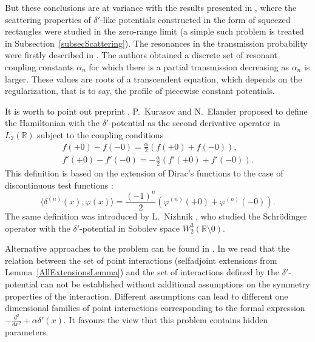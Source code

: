 \documentclass[11pt,english]{amsart}%
\begin{document}
But these conclusions are at variance with the results presented in \cite{ChristianZolotarIermak03,ToyamaNogami,
Zolotaryuk06, Zolotaryuk08},  where the scattering properties of  $\delta'$-like potentials constructed
in the form of squeezed rectangles were studied in the zero-range limit
(a simple such problem is treated in  Subsection~\ref{subsecScattering}).
The resonances in the transmission probability were firstly described  in \cite{ChristianZolotarIermak03}.
The authors  obtained a discrete set of resonant coupling constants $\alpha_n$
for which there is a partial transmission decreasing as $\alpha_n$ is larger. These values are roots of a
transcendent equation, which depends on the regularization, that is to say, the profile of  piecewise constant potentials.


It is worth to  point out preprint \cite{KurElaMSI93}.
P.~Kurasov and N.~Elander proposed to define the Hamiltonian with the $\delta'$-potential as the second
derivative operator in $L_2(\mathbb R)$ subject to the coupling conditions
\begin{equation}\label{KurasovDefn}
\begin{gathered}
f(+0)-f(-0)=\frac{\alpha}{2}(f(+0)+f(-0)), \\[5pt]
f'(+0)-f'(-0)=-\frac{\alpha}{2}(f'(+0)+f'(-0)).
\end{gathered}
\end{equation}
This definition is based on the extension of Dirac's functions
to the case of discontinuous test functions \cite{KurasovJMAA96}:
$$\langle\delta^{(n)}(x),\varphi(x)
\rangle=\frac{(-1)^{n}}{2}(\varphi^{(n)}(+0)+\varphi^{(n)}(-0)).$$
The same definition was introduced by L.~Nizhnik \cite{NizhFAA2006}, who studied the Schr\"{o}dinger operator with
the $\delta'$-potential in Sobolev space $W_2^3(\mathbb R\setminus 0)$.

Alternative approaches to the problem can be found in \cite{GriffithsJPhA1993, GesHolJPA, KiselevJMAA1997}.
In \cite[p.~339]{AlbeverioKurasov} we read that the relation between the set of point interactions (selfadjoint extensions from Lemma~\ref{AllExtensionsLemma}) and the set of interactions defined by the $\delta'$-potential can not be established  without additional assumptions on the symmetry properties of the interaction.
Different assumptions can lead to different one dimensional families of point interactions corresponding to the formal expression $-\frac{d^2}{dx^2}+\alpha\delta'(x)$.
It favours the view that this problem contains  hidden parameters.
\end{document}
